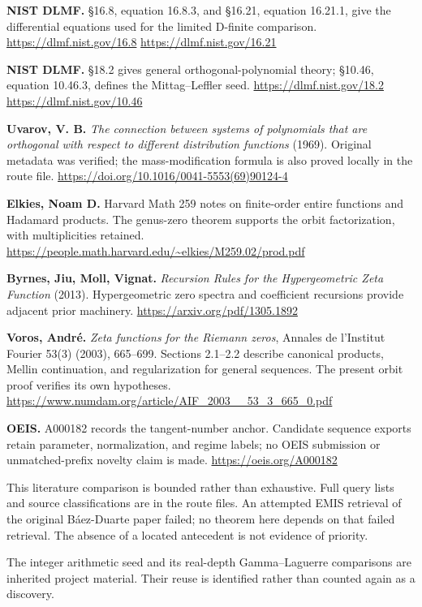 \documentclass[11pt]{article}
\begin{document}
\textbf{NIST DLMF.} \S16.8, equation 16.8.3, and \S16.21, equation 16.21.1,
give the differential equations used for the limited D-finite comparison.
\url{https://dlmf.nist.gov/16.8}\quad
\url{https://dlmf.nist.gov/16.21}

\textbf{NIST DLMF.} \S18.2 gives general orthogonal-polynomial theory;
\S10.46, equation 10.46.3, defines the Mittag--Leffler seed.
\url{https://dlmf.nist.gov/18.2}\quad
\url{https://dlmf.nist.gov/10.46}

\textbf{Uvarov, V. B.} \textit{The connection between systems of polynomials
that are orthogonal with respect to different distribution functions} (1969).
Original metadata was verified; the mass-modification formula is also proved
locally in the route file.
\url{https://doi.org/10.1016/0041-5553(69)90124-4}

\textbf{Elkies, Noam D.} Harvard Math 259 notes on finite-order entire
functions and Hadamard products. The genus-zero theorem supports the orbit
factorization, with multiplicities retained.
\url{https://people.math.harvard.edu/~elkies/M259.02/prod.pdf}

\textbf{Byrnes, Jiu, Moll, Vignat.} \textit{Recursion Rules for the
Hypergeometric Zeta Function} (2013). Hypergeometric zero spectra and
coefficient recursions provide adjacent prior machinery.
\url{https://arxiv.org/pdf/1305.1892}

\normalsize
\textbf{Voros, Andr\'e.} \textit{Zeta functions for the Riemann zeros},
Annales de l'Institut Fourier 53(3) (2003), 665--699. Sections 2.1--2.2
describe canonical products, Mellin continuation, and regularization for
general sequences. The present orbit proof verifies its own hypotheses.
\url{https://www.numdam.org/article/AIF_2003__53_3_665_0.pdf}

\textbf{OEIS.} A000182 records the tangent-number anchor. Candidate sequence
exports retain parameter, normalization, and regime labels; no OEIS submission
or unmatched-prefix novelty claim is made.
\url{https://oeis.org/A000182}

This literature comparison is bounded rather than exhaustive.
Full query lists and source classifications are in the route files. An
attempted EMIS retrieval of the original B\'aez-Duarte paper failed; no theorem
here depends on that failed retrieval. The absence of a located antecedent is not evidence of priority.

The integer arithmetic seed and its real-depth Gamma--Laguerre comparisons
are inherited project material. Their reuse is identified rather than counted
again as a discovery.


\end{document}
